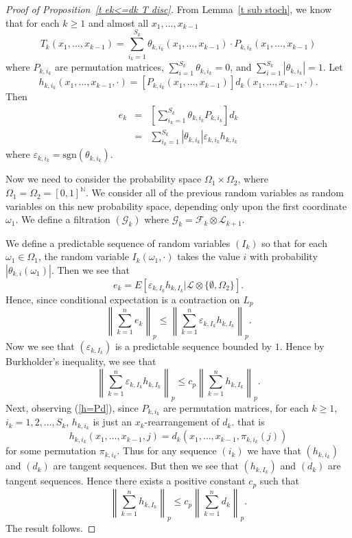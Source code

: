 \documentclass[12pt]{amsart}
\begin{document}
\begin{proof}[Proof of Proposition~\ref{t ek<=dk T disc}]
 From Lemma~\ref{t sub stoch}, we know that for each $k\geq1$ and
almost all $x_1,\dots,x_{k-1}$
\[T_k(x_1,\dots,x_{k-1})=\sum_{i_k=1}^{S_k} \theta _{k,i_k}(x_1,\dots,x_{k-1})\cdot P_{k,i_k}(x_1,\dots,x_{k-1})\]
where $P_{k,i_k}$ are permutation matrices, $\sum_{i=1}^{S_k}
\theta _{k,i_k}=0$, and $\sum_{i=1}^{S_k} |\theta _{k,i_k}|=1$.
Let
\begin{equation}
\label{h=Pd}
h_{k,i_k}(x_1,\dots,x_{k-1},\cdot)=[P_{k,i_k}(x_1,\dots,x_{k-1})]d_k(x_1,\dots,x_{k-1},\cdot).
\end{equation}
Then
\begin{eqnarray*}
e_k& =& \left[\sum_{i_k=1}^{S_k} \theta _{k,i_k}P_{k,i_k}\right]d_k\\
&=&\sum_{i_k=1}^{S_k} |\theta _{k,i_k}|\varepsilon _{k,i_k}h_{k,i_k}
\end{eqnarray*}
where $\varepsilon_{k,i_k}= \mbox{sgn}(\theta _{k,i_k})$.

Now we need to consider the probability space $\Omega_1 \times
\Omega_2$, where $\Omega_1 = \Omega_2 = [0,1]^{\mathbb{N}}$. We
consider all of the previous random variables as random variables
on this new probability space, depending only upon the first
coordinate $\omega_1$.  We define a filtration $(\mathcal G_k)$
where $\mathcal G_k = \mathcal F_k \otimes \mathcal L_{k+1}$.

We define a predictable sequence of random variables $(I_k)$ so that for
each $\omega_1 \in \Omega_1$, the random variable
$I_k(\omega_1,\cdot)$ takes the value $i$ with probability
$|\theta_{k,i}(\omega_1)|$.  Then we see that
\[ e_k = E[\varepsilon_{k,I_k} h_{k,I_k} |
   \mathcal L \otimes \{\emptyset,\Omega_2\}] .\]
Hence, since conditional expectation is a contraction on $L_p$
\[
\left\| \sum_{k=1}^n e_k \right\|_p \le \left\| \sum_{k=1}^n
\varepsilon_{k,I_k} h_{k,I_k} \right\|_p .
\]
Now we see that $(\varepsilon_{k,I_k})$ is a predictable sequence
bounded by $1$.  Hence by Burkholder's inequality, we see that
\[
\left\| \sum_{k=1}^n \varepsilon_{k,I_k} h_{k,I_k} \right\|_p \le
c_p \left\| \sum_{k=1}^n h_{k,I_k} \right\|_p .
\]
Next, observing (\ref{h=Pd}), since $P_{k,i_k}$ are permutation
matrices, for each $k\geq1$, $i_k=1,2,\dots,S_k$, $h_{k,i_k}$ is
just an $x_k$-rearrangement of $d_k$. that is
\[h_{k,i_k}(x_1,\dots,x_{k-1},j)=d_k(x_1,\dots,x_{k-1},\pi_{k,i_k}(j))\]
for some permutation $\pi _{k,i_k}$. Thus for any sequence
$(i_k)$ we have that
$(h_{k,i_k})$ and
$(d_k)$ are tangent sequences.
But then we see that $(h_{k,I_k})$ and $(d_k)$ are tangent
sequences.  Hence there
exists a positive constant $c_p$ such that
\[\left\|\sum_{k=1}^n h_{k,I_k}\right\|_p\leq
c_p \left\|\sum_{k=1}^n d_k\right\|_p . \]
The result follows.
\end{proof}
\end{document}
